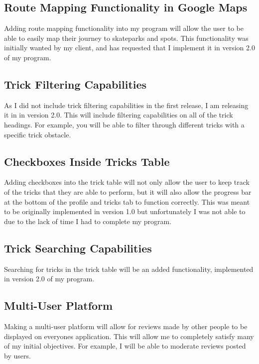 	\subsection{Route Mapping Functionality in Google Maps}

Adding route mapping functionality into my program will allow the user to be able to easily map their journey to skateparks and spots. This functionality was initially wanted by my client, and has requested that I implement it in version 2.0 of my program.

	\subsection{Trick Filtering Capabilities}

As I did not include trick filtering capabilities in the first release, I am releasing it in in version 2.0. This will include filtering capabilities on all of the trick headings. For example, you will be able to filter through different tricks with a specific trick obstacle.

	\subsection{Checkboxes Inside Tricks Table}

Adding checkboxes into the trick table will not only allow the user to keep track of the tricks that they are able to perform, but it will also allow the progress bar at the bottom of the profile and tricks tab to function correctly. This was meant to be originally implemented in version 1.0 but unfortunately I was not able to due to the lack of time I had to complete my program.

	\subsection{Trick Searching Capabilities}

Searching for tricks in the trick table will be an added functionality, implemented in version 2.0 of my program.

	\subsection{Multi-User Platform}

Making a multi-user platform will allow for reviews made by other people to be displayed on everyones application. This will allow me to completely satisfy many of my initial objectives. For example, I will be able to moderate reviews posted by users.

